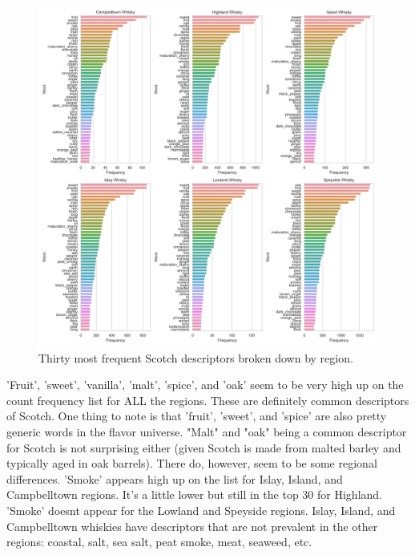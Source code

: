 \documentclass{article}
\begin{document}
	 	 \begin{figure}[H]
	 	\begin{center}
	 		\includegraphics[totalheight=13cm]{../images/EDA/topwordsbyregion.jpg}
	 	\end{center}
	 	\caption{Thirty most frequent Scotch descriptors broken down by region.}
	 \end{figure}
	'Fruit', 'sweet', 'vanilla', 'malt', 'spice', and 'oak' seem to be very high up on the count frequency list for ALL the regions. These are definitely common descriptors of Scotch. One thing to note is that 'fruit', 'sweet', and 'spice' are also pretty generic words in the flavor universe. "Malt" and "oak" being a common descriptor for Scotch is not surprising either (given Scotch is made from malted barley and typically aged in oak barrels). There do, however, seem to be some regional differences. 'Smoke' appears high up on the list for Islay, Island, and Campbelltown regions. It's a little lower but still in the top 30 for Highland. 'Smoke' doesnt appear for the Lowland and Speyside regions. Islay, Island, and Campbelltown whiskies have descriptors that are not prevalent in the other regions: coastal, salt, sea salt, peat smoke, meat, seaweed, etc.  
\end{document}

